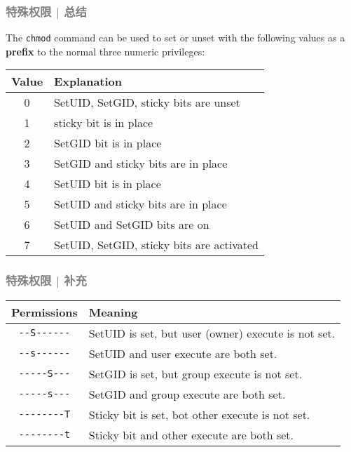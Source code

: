 \begin{frame}[fragile]
  \frametitle{\textcolor{gray}{特殊权限 | 总结}}
  The \verb|chmod| command can be used to set or unset with the following values as a \textbf{prefix} to the normal three numeric privileges:
  \begin{table}
    \centering
    \begin{tabular}{cl}
      \hline
      \rowcolor{blue!50}Value & Explanation\\
      \hline
      0 & SetUID, SetGID, sticky bits are unset\\
      1 & sticky bit is in place\\
      2 & SetGID bit is in place\\ 
      3 & SetGID and sticky bits are in place\\
      4 & SetUID bit is in place\\
      5 & SetUID and sticky bits are in place\\
      6 & SetUID and SetGID bits are on\\
      7 & SetUID, SetGID, sticky bits are activated\\
      \hline
    \end{tabular}
  \end{table}
\end{frame}

\begin{frame}[fragile]
  \frametitle{\textcolor{gray}{特殊权限 | 补充}}
  \begin{table}
    \centering
    \begin{tabular}{cl}
      \hline
      \rowcolor{blue!50} Permissions & Meaning\\
      \hline
      \verb|--S------| & SetUID is set, but user (owner) execute is not set.\\
      \verb|--s------| & SetUID and user execute are both set.\\
      \verb|-----S---| & SetGID is set, but group execute is not set.\\
      \verb|-----s---| & SetGID and group execute are both set.\\
      \verb|--------T| & Sticky bit is set, bot other execute is not set.\\
      \verb|--------t| & Sticky bit and other execute are both set.\\
      \hline
    \end{tabular}
  \end{table}
\end{frame}

